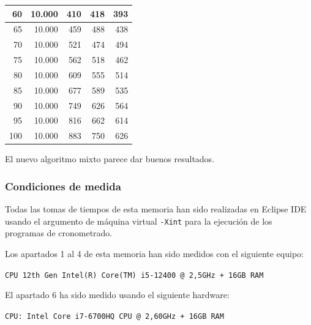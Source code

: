 \documentclass[12pt,a4paper]{article}
\renewcommand{\thesubsubsection}{\arabic{subsubsection}.}
\newcommand{\result}[1]{%
  \subsubsection{#1}%
  \label{result:\thesubsubsection}
}
\begin{document}
\begin{table}[H]
\begin{tabular}{|r|r|r|r|r|}
60                      & 10.000                             & 410                              & 418                                & 393                                \\ \hline
65                      & 10.000                             & 459                              & 488                                & 438                                \\ \hline
70                      & 10.000                             & 521                              & 474                                & 494                                \\ \hline
75                      & 10.000                             & 562                              & 518                                & 462                                \\ \hline
80                      & 10.000                             & 609                              & 555                                & 514                                \\ \hline
85                      & 10.000                             & 677                              & 589                                & 535                                \\ \hline
90                      & 10.000                             & 749                              & 626                                & 564                                \\ \hline
95                      & 10.000                             & 816                              & 662                                & 614                                \\ \hline
100                     & 10.000                             & 883                              & 750                                & 626                                \\ \hline
\end{tabular}
\end{table}
El nuevo algoritmo mixto parece dar buenos resultados.


\newpage
\result{Condiciones de medida}
\hspace{3mm}
Todas las tomas de tiempos de esta memoria han sido realizadas en Eclipse IDE usando el argumento de máquina virtual \texttt{-Xint} para la ejecución de los programas de cronometrado.

\vspace{2mm}
Los apartados 1 al 4 de esta memoria han sido medidos con el siguiente equipo:

\verb|CPU 12th Gen Intel(R) Core(TM) i5-12400 @ 2,5GHz + 16GB RAM|

\vspace{4mm}
El apartado 6 ha sido medido usando el siguiente hardware:

\verb|CPU: Intel Core i7-6700HQ CPU @ 2,60GHz + 16GB RAM|
\end{document}
